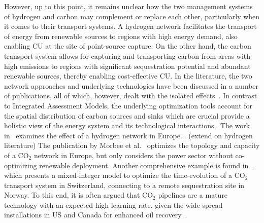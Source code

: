 \documentclass[twocolumn]{article}
\newcommand{\carbon}{CO$_2$}
\begin{document}
However, up to this point, it remains unclear how the two management systems of hydrogen and carbon may complement or replace each other, particularly when it comes to their transport systems. A hydrogen network facilitates the transport of energy from renewable sources to regions with high energy demand, also enabling CU at the site of point-source capture. On the other hand, the carbon transport system allows for capturing and transporting carbon from areas with high emissions to regions with significant sequestration potential and abundant renewable sources, thereby enabling cost-effective CU.
In the literature, the two network approaches and underlying technologies have been discussed in a number of publications, all of which, however, dealt with the isolated effects~\cite{bakkenLinearModelsOptimization2008,morbeeOptimisedDeploymentEuropean2012,stewartFeasibilityEuropeanwideIntegrated2014,oeiModelingCarbonCapture2014,elahiMultiperiodLeastCost2014,burandtDecarbonizingChinaEnergy2019,middletonSimCCSOpensourceTool2020,bjerketvedtOptimalDesignCost2020,weiProposedGlobalLayout2021,damoreOptimalDesignEuropean2021,becattiniCarbonDioxideCapture2022}. In contrast to Integrated Assessment Models, the underlying optimization tools account for the spatial distribution of carbon sources and sinks which are crucial provide a holistic view of the energy system and its technological interactions.. The work in~\cite{neumannBenefitsHydrogenNetwork2022} examines the effect of a hydrogen network in Europe... (extend on hydrogen literature)
The publication by Morbee et al.~\cite{morbeeOptimisedDeploymentEuropean2012} optimizes the topology and capacity of a \carbon{} network in Europe, but only considers the power sector without co-optimizing renewable deployment.
Another comprehensive example is found in~\cite{becattiniCarbonDioxideCapture2022}, which presents a mixed-integer model to optimize the time-evolution of a \carbon{} transport system in Switzerland, connecting to a remote sequestration site in Norway. To this end, it is often argued that \carbon{} pipelines are a mature technology with an expected high learning rate, given the wide-spread installations in US and Canada for enhanced oil recovery~\cite{righettiSitingCarbonDioxide2017,friedmannNETZEROGEOSPHERICRETURN}.
\end{document}

